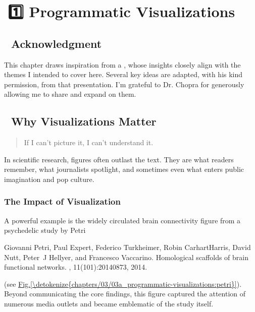 \documentclass[letterpaper,10pt,english]{jupyterBook}
\begin{document}
\sphinxstepscope


\section{📙1️⃣ Programmatic Visualizations}
\label{\detokenize{chapters/03/03a_programmatic-visualizations:programmatic-visualizations}}\label{\detokenize{chapters/03/03a_programmatic-visualizations::doc}}

\subsection{🙏 Acknowledgment}
\label{\detokenize{chapters/03/03a_programmatic-visualizations:acknowledgment}}
\sphinxAtStartPar
This chapter draws inspiration from a , whose insights closely align with the themes I intended to cover here. Several key ideas are adapted, with his kind permission, from that presentation. I’m grateful to Dr. Chopra for generously allowing me to share and expand on them.


\subsection{👀 Why Visualizations Matter}
\label{\detokenize{chapters/03/03a_programmatic-visualizations:why-visualizations-matter}}\begin{quote}

\sphinxAtStartPar
If I can’t picture it, I can’t understand it.

\sphinxAtStartPar
{}
\end{quote}

\sphinxAtStartPar
In scientific research, figures often outlast the text. They are what readers remember, what journalists spotlight, and sometimes even what enters public imagination and pop culture.


\subsubsection{The Impact of Visualization}
\label{\detokenize{chapters/03/03a_programmatic-visualizations:the-impact-of-visualization}}
\sphinxAtStartPar
A powerful example is the widely circulated brain connectivity figure from a psychedelic study by Petri %
\begin{footnote}[1]\sphinxAtStartFootnote
Giovanni Petri, Paul Expert, Federico Turkheimer, Robin Carhart\sphinxhyphen{}Harris, David Nutt, Peter J Hellyer, and Francesco Vaccarino. Homological scaffolds of brain functional networks. , 11(101):20140873, 2014.
%
\end{footnote} (see \hyperref[\detokenize{chapters/03/03a_programmatic-visualizations:petri}]{Fig.\@ \ref{\detokenize{chapters/03/03a_programmatic-visualizations:petri}}}). Beyond communicating the core findings, this figure captured the attention of numerous media outlets and became emblematic of the study itself.
\end{document}
